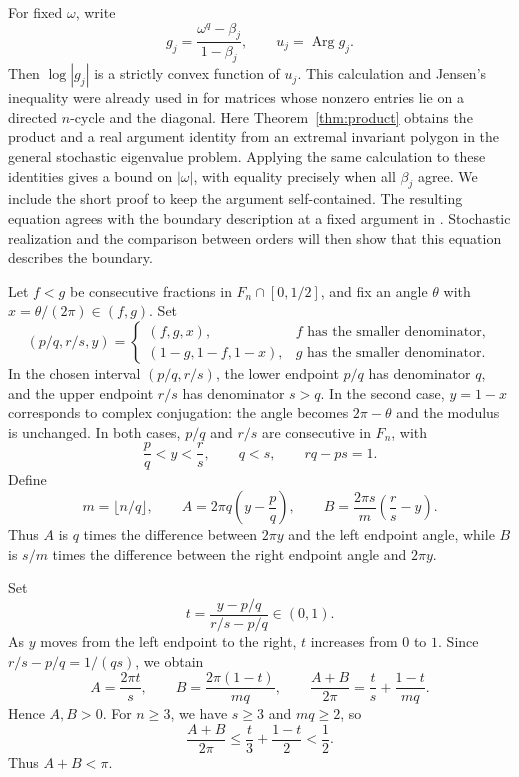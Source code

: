 \documentclass[11pt,a4paper]{article}
\theoremstyle{definition}
\theoremstyle{remark}
\numberwithin{equation}{section}
\begin{document}
For fixed $\omega$, write
\[
 g_j=\frac{\omega^q-\beta_j}{1-\beta_j},\qquad
 u_j=\operatorname{Arg}g_j.
\]
Then $\log|g_j|$ is a strictly convex function of $u_j$. This calculation and Jensen's inequality were already used in \cite[Lemma~2.2 and Proposition~3.1]{VGNCycle} for matrices whose nonzero entries lie on a directed $n$-cycle and the diagonal. Here Theorem~\ref{thm:product} obtains the product and a real argument identity from an extremal invariant polygon in the general stochastic eigenvalue problem. Applying the same calculation to these identities gives a bound on $|\omega|$, with equality precisely when all $\beta_j$ agree. We include the short proof to keep the argument self-contained. The resulting equation agrees with the boundary description at a fixed argument in \cite[Theorems~1.2 and~4.3; Lemma~4.4]{KirklandLaffeySmigoc}. Stochastic realization and the comparison between orders will then show that this equation describes the boundary.

Let $f<g$ be consecutive fractions in $F_n\cap[0,1/2]$, and fix an angle $\theta$ with $x=\theta/(2\pi)\in(f,g)$. Set
\[
 (p/q,r/s,y)=
 \begin{cases}
 (f,g,x),&f\text{ has the smaller denominator},\\
 (1-g,1-f,1-x),&g\text{ has the smaller denominator}.
 \end{cases}
\]
In the chosen interval $(p/q,r/s)$, the lower endpoint $p/q$ has denominator $q$, and the upper endpoint $r/s$ has denominator $s>q$. In the second case, $y=1-x$ corresponds to complex conjugation: the angle becomes $2\pi-\theta$ and the modulus is unchanged. In both cases, $p/q$ and $r/s$ are consecutive in $F_n$, with
\[
 \frac pq<y<\frac rs,\qquad q<s,\qquad rq-ps=1.
\]
Define
\begin{equation}\label{eq:scalar-data}
 m=\lfloor n/q\rfloor,\qquad
 A=2\pi q\left(y-\frac pq\right),\qquad
 B=\frac{2\pi s}{m}\left(\frac rs-y\right).
\end{equation}
Thus $A$ is $q$ times the difference between $2\pi y$ and the left endpoint angle, while $B$ is $s/m$ times the difference between the right endpoint angle and $2\pi y$.

Set
\[
 t=\frac{y-p/q}{r/s-p/q}\in(0,1).
\]
As $y$ moves from the left endpoint to the right, $t$ increases from $0$ to $1$. Since $r/s-p/q=1/(qs)$, we obtain
\begin{equation}\label{eq:angle-budget}
 A=\frac{2\pi t}s,\qquad B=\frac{2\pi(1-t)}{mq},\qquad
 \frac{A+B}{2\pi}=\frac ts+\frac{1-t}{mq}.
\end{equation}
Hence $A,B>0$. For $n\ge3$, we have $s\ge3$ and $mq\ge2$, so
\[
 \frac{A+B}{2\pi}\le\frac t3+\frac{1-t}{2}<\frac12.
\]
Thus $A+B<\pi$.
\end{document}
